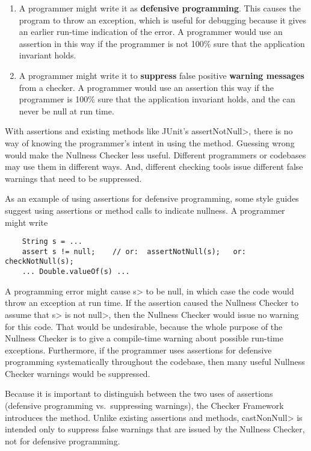\begin{enumerate}
\item
  A programmer might write it as \textbf{defensive programming}.  This causes
  the program to throw an exception, which is useful for debugging because
  it gives an earlier run-time indication of the error.
  A programmer would use an assertion in this way if the programmer is not
  100\% sure that the application invariant holds.


\item
  A programmer might write it to \textbf{suppress} false positive
  \textbf{warning messages} from a checker.  A programmer would use an
  assertion this way if the programmer is 100\% sure that the application
  invariant holds, and the can never be null at run time.

\end{enumerate}

With assertions and existing methods like JUnit's \<assertNotNull>, there
is no way of knowing the programmer's intent in using the method.  Guessing
wrong would make the Nullness Checker less useful.  Different programmers
or codebases may use them in different ways.  And, different checking tools
issue different false warnings that need to be suppressed.

As an example of using assertions for defensive programming, some style
guides suggest using assertions or method calls to indicate nullness.  A
programmer might write

\begin{Verbatim}
    String s = ...
    assert s != null;    // or:  assertNotNull(s);   or: checkNotNull(s);
    ... Double.valueOf(s) ...
\end{Verbatim}

A programming error might cause \<s> to be null, in which case the code
would throw an exception at run time.
If the assertion caused the Nullness Checker to assume that \<s> is not
\<null>, then the Nullness Checker would issue no warning for this code.
That would be undesirable, because the whole purpose of the Nullness
Checker is to give a compile-time warning about possible run-time
exceptions.  Furthermore, if the programmer uses assertions for defensive
programming systematically throughout the codebase, then many useful
Nullness Checker warnings would be suppressed.


Because it is important to distinguish between the two uses of assertions
(defensive programming vs.~suppressing warnings), the Checker Framework
introduces the  method.
Unlike existing assertions and
methods, \<castNonNull> is intended only to suppress false warnings that are
issued by the Nullness Checker, not for defensive programming.


